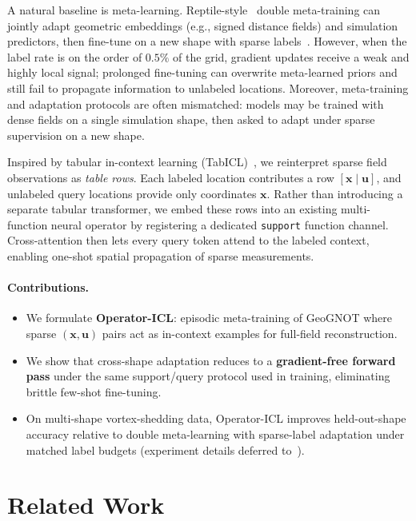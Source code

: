 \documentclass[11pt,a4paper]{article}
\begin{document}
A natural baseline is meta-learning.
Reptile-style~\cite{nichol2018reptile} double meta-training can jointly adapt geometric embeddings (e.g., signed distance fields) and simulation predictors, then fine-tune on a new shape with sparse labels~\cite{finn2017maml}.
However, when the label rate is on the order of $0.5\%$ of the grid, gradient updates receive a weak and highly local signal; prolonged fine-tuning can overwrite meta-learned priors and still fail to propagate information to unlabeled locations.
Moreover, meta-training and adaptation protocols are often mismatched: models may be trained with dense fields on a single simulation shape, then asked to adapt under sparse supervision on a new shape.

Inspired by tabular in-context learning (TabICL)~\cite{hollmann2025tabicl,gardner2024tabpfn}, we reinterpret sparse field observations as \emph{table rows}.
Each labeled location contributes a row $[\mathbf{x}\mid\mathbf{u}]$, and unlabeled query locations provide only coordinates $\mathbf{x}$.
Rather than introducing a separate tabular transformer, we embed these rows into an existing multi-function neural operator by registering a dedicated \texttt{support} function channel.
Cross-attention then lets every query token attend to the labeled context, enabling one-shot spatial propagation of sparse measurements.

\paragraph{Contributions.}
\begin{itemize}[leftmargin=1.2em]
    \item We formulate \textbf{Operator-ICL}: episodic meta-training of GeoGNOT where sparse $(\mathbf{x},\mathbf{u})$ pairs act as in-context examples for full-field reconstruction.
    \item We show that cross-shape adaptation reduces to a \textbf{gradient-free forward pass} under the same support/query protocol used in training, eliminating brittle few-shot fine-tuning.
    \item On multi-shape vortex-shedding data, Operator-ICL improves held-out-shape accuracy relative to double meta-learning with sparse-label adaptation under matched label budgets (experiment details deferred to~).
\end{itemize}

\section{Related Work}
\label{sec:related}
\end{document}
